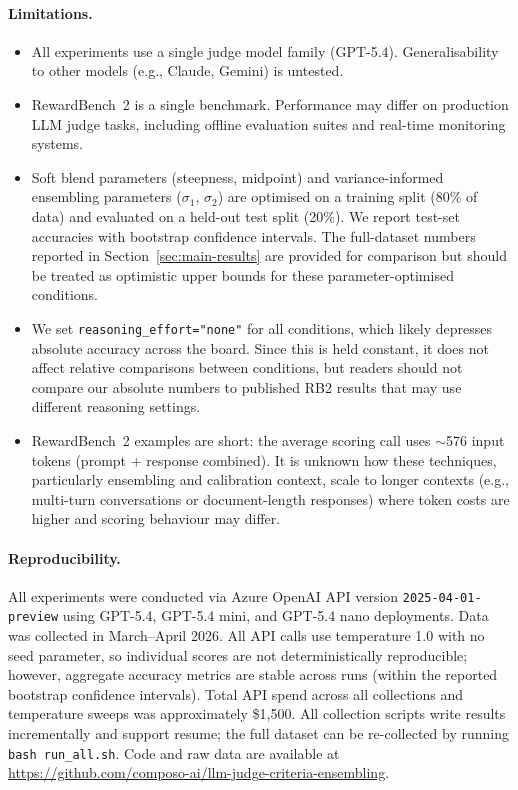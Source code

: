 \documentclass{article}
\begin{document}
\paragraph{Limitations.}

\begin{itemize}
  \item All experiments use a single judge model family (GPT-5.4). Generalisability to other models (e.g., Claude, Gemini) is untested.
  \item RewardBench~2 is a single benchmark. Performance may differ on production LLM judge tasks, including offline evaluation suites and real-time monitoring systems.
  \item Soft blend parameters (steepness, midpoint) and variance-informed ensembling parameters ($\sigma_1$, $\sigma_2$) are optimised on a training split (80\% of data) and evaluated on a held-out test split (20\%). We report test-set accuracies with bootstrap confidence intervals. The full-dataset numbers reported in Section~\ref{sec:main-results} are provided for comparison but should be treated as optimistic upper bounds for these parameter-optimised conditions.
  \item We set \texttt{reasoning\_effort="none"} for all conditions, which likely depresses absolute accuracy across the board. Since this is held constant, it does not affect relative comparisons between conditions, but readers should not compare our absolute numbers to published RB2 results that may use different reasoning settings.
  \item RewardBench~2 examples are short: the average scoring call uses ${\sim}$576 input tokens (prompt + response combined). It is unknown how these techniques, particularly ensembling and calibration context, scale to longer contexts (e.g., multi-turn conversations or document-length responses) where token costs are higher and scoring behaviour may differ.
\end{itemize}

\paragraph{Reproducibility.}

All experiments were conducted via Azure OpenAI API version \texttt{2025-04-01-preview} using GPT-5.4, GPT-5.4 mini, and GPT-5.4 nano deployments. Data was collected in March--April 2026. All API calls use temperature 1.0 with no seed parameter, so individual scores are not deterministically reproducible; however, aggregate accuracy metrics are stable across runs (within the reported bootstrap confidence intervals). Total API spend across all collections and temperature sweeps was approximately \$1,500. All collection scripts write results incrementally and support resume; the full dataset can be re-collected by running \texttt{bash run\_all.sh}. Code and raw data are available at \url{https://github.com/composo-ai/llm-judge-criteria-ensembling}.
\end{document}
